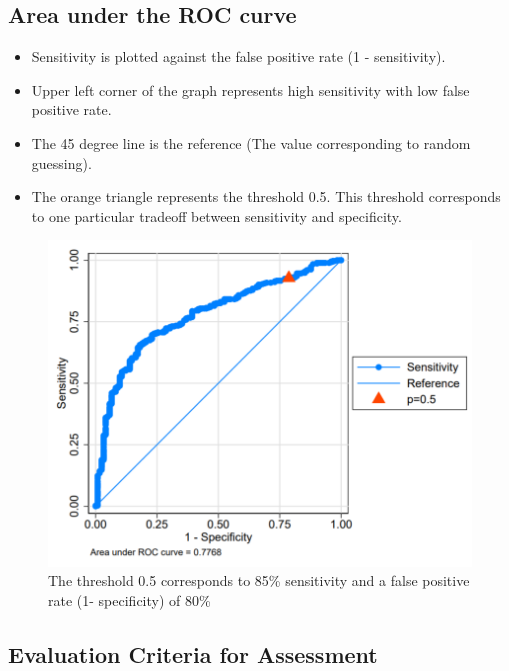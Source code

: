 \documentclass[12pt, oneside]{article}
\begin{document}
\subsection{Area under the ROC curve}
\begin{itemize}
    \item Sensitivity is plotted against the false positive rate (1 - sensitivity).
    \item Upper left corner of the graph represents high sensitivity with low false positive rate. 
    \item The 45 degree line is the reference (The value corresponding to random guessing).
    \item The orange triangle represents the threshold 0.5. This threshold corresponds to one particular tradeoff between sensitivity and specificity.  
\end{itemize}
\begin{figure}[ht]
    \centering
    \includegraphics[width=\textwidth]{AUC.png}       
    \caption{The threshold 0.5 corresponds to 85\% sensitivity and a false positive rate (1- specificity) of 80\%}
\end{figure}

\subsection{Evaluation Criteria for Assessment}
\end{document}
